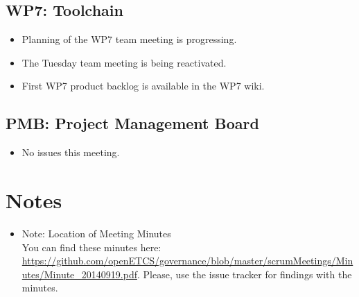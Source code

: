 \documentclass[a4paper, 11pt]{article}
\begin{document}
\subsection{WP7: Toolchain}

\begin{itemize}
\item Planning of the WP7 team meeting is progressing. 
\item The Tuesday team meeting is being reactivated.
\item First WP7 product backlog is available in the WP7 wiki.
\end{itemize}

\subsection{PMB: Project Management Board}
\begin{itemize}

\item No issues this meeting.

\end{itemize}

\section{Notes}
\begin{itemize}

\item Note: Location of Meeting Minutes\\
You can find these minutes here: \url{https://github.com/openETCS/governance/blob/master/scrumMeetings/Minutes/Minute_20140919.pdf}. Please, use the issue tracker for findings with the minutes.

\end{itemize}
\end{document}
